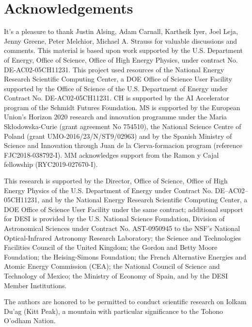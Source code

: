 \documentclass[12pt, letterpaper, preprint]{aastex63}
\begin{document}
\section*{Acknowledgements}
It's a pleasure to thank
    Justin Alsing, 
    Adam Carnall, 
    Kartheik Iyer, 
    Joel Leja, 
    Jenny Greene, 
    Peter Melchior,
    Michael A. Strauss
for valuable discussions and comments. 
This material is based upon work supported by the U.S. Department of Energy,
Office of Science, Office of High Energy Physics, under contract No.
DE-AC02-05CH11231.  This project used resources of the National Energy Research
Scientific Computing Center, a DOE Office of Science User Facility supported by
the Office of Science of the U.S.  Department of Energy under Contract No.
DE-AC02-05CH11231. 
CH is supported by the AI Accelerator program of the Schmidt Futures Foundation.
MS is supported by the European Union's  Horizon 2020 research and innovation
programme under the Maria Sk\l{}odowska-Curie (grant agreement No 754510), the
National Science Centre of Poland (grant UMO-2016/23/N/ST9/02963) and by the
Spanish Ministry of Science and Innovation through Juan de la Cierva-formacion
program (reference FJC2018-038792-I).
MM acknowledges support from the Ramon y Cajal fellowship (RYC2019-027670-I).

This research is supported by the Director, Office of Science, Office of High
Energy Physics of the U.S. Department of Energy under Contract No.
DE–AC02–05CH11231, and by the National Energy Research Scientific Computing
Center, a DOE Office of Science User Facility under the same contract;
additional support for DESI is provided by the U.S. National Science
Foundation, Division of Astronomical Sciences under Contract No. AST-0950945 to
the NSF’s National Optical-Infrared Astronomy Research Laboratory; the Science
and Technologies Facilities Council of the United Kingdom; the Gordon and Betty
Moore Foundation; the Heising-Simons Foundation; the French Alternative
Energies and Atomic Energy Commission (CEA); the National Council of Science
and Technology of Mexico; the Ministry of Economy of Spain, and by the DESI
Member Institutions.

The authors are honored to be permitted to conduct scientific research on
Iolkam Du’ag (Kitt Peak), a mountain with particular significance to the Tohono
O’odham Nation.


\appendix





 
\end{document}
